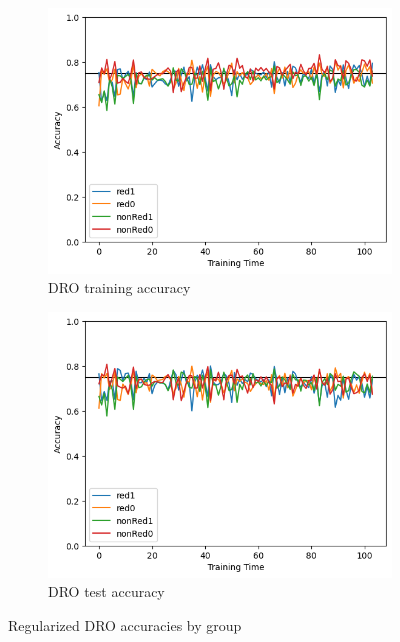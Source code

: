 \documentclass{article}
\begin{document}
\begin{figure}
\begin{subfigure}{.5\textwidth}
  \centering
  \includegraphics[width=1.\linewidth]{images/dro_train_reg.png}
  \caption{DRO training accuracy}
\end{subfigure}
\begin{subfigure}{.5\textwidth}
  \centering
  \includegraphics[width=1.\linewidth]{images/dro_test_reg.png}
  \caption{DRO test accuracy}
\end{subfigure}

\caption{Regularized DRO accuracies by group}
\label{dro_reg}
\end{figure}
\end{document}
